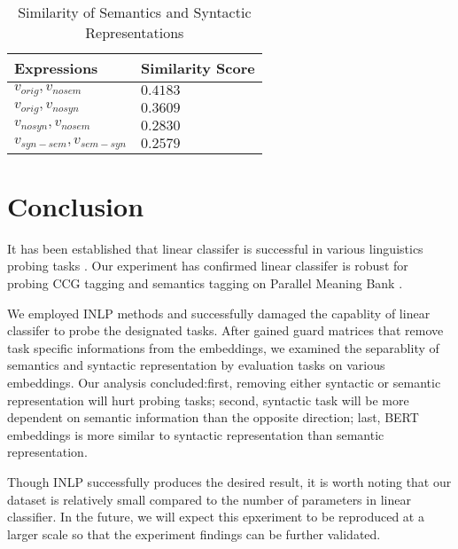 \documentclass[11pt,a4paper]{article}
\begin{document}
\begin{table}[h]
    \centering
    \begin{tabular}{p{4cm}p{3cm}}
        \hline
        \textbf{Expressions} & \textbf{Similarity Score}\\ \hline 
        $v_{orig}, v_{nosem}$ &  $0.4183$ \\ 
        $v_{orig}, v_{nosyn}$ & $0.3609$\\ 
        $v_{nosyn}, v_{nosem}$ & $0.2830$ \\
        $v_{syn-sem}, v_{sem-syn}$ & $0.2579$ \\ 
        
        \hline
    \end{tabular}
    \caption{\label{sim} Similarity of Semantics and Syntactic Representations
    }
\end{table}



\section{Conclusion}
\label{sec:conclusion}
It has been established that linear classifer is successful in various linguistics probing tasks \citep{language-transfer}. Our experiment has confirmed linear classifer is robust for probing CCG tagging and semantics tagging on Parallel Meaning Bank \citep{pmbData}. 

We employed INLP methods and successfully damaged the capablity of linear classifer to probe the designated tasks. After gained guard matrices that remove task specific informations from the embeddings, we examined the separablity of semantics and syntactic representation by evaluation tasks on various embeddings. Our analysis concluded:first, removing either syntactic or semantic representation will hurt probing tasks; second, syntactic task will be more dependent on semantic information than the opposite direction; last, BERT embeddings is more similar to syntactic representation than semantic representation. 

Though INLP successfully produces the desired result, it is worth noting that our dataset is relatively small compared to the number of parameters in linear classifier. In the future, we will expect this epxeriment to be reproduced at a larger scale so that the experiment findings can be further validated. 
















\end{document}
